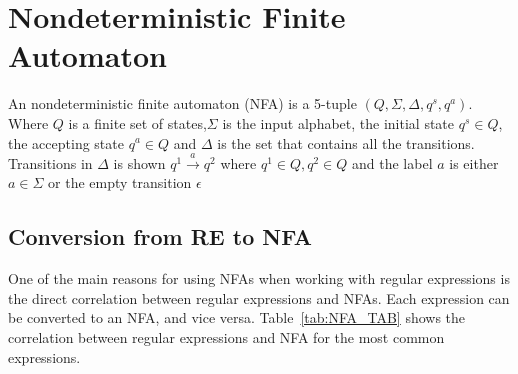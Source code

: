 \newpage
\section{Nondeterministic Finite Automaton}
\begin{mydef}
An nondeterministic finite automaton (NFA) is a 5-tuple $(Q,\Sigma,\Delta,q^s ,q^a)$. Where $Q$ is a finite set of states,$\Sigma$ is the input alphabet, the initial state $q^s \in Q$,  the accepting state $q^a \in Q$ and $\Delta$ is the set that contains all the transitions. Transitions in $\Delta$ is shown $q^1\xrightarrow{a}q^2$ where $q^1\in Q,q^2\in Q$ and the label $a$ is either $a \in \Sigma$ or  the empty transition $\epsilon$
\end{mydef}

\subsection{Conversion from RE to NFA}
\label{RA_TO_NFA}
One of the main reasons for using NFAs when working with regular expressions is the direct correlation between regular expressions and NFAs. Each expression can be converted to an NFA, and vice versa. Table~\ref{tab:NFA_TAB} shows the correlation between regular expressions and NFA for the most common expressions.

